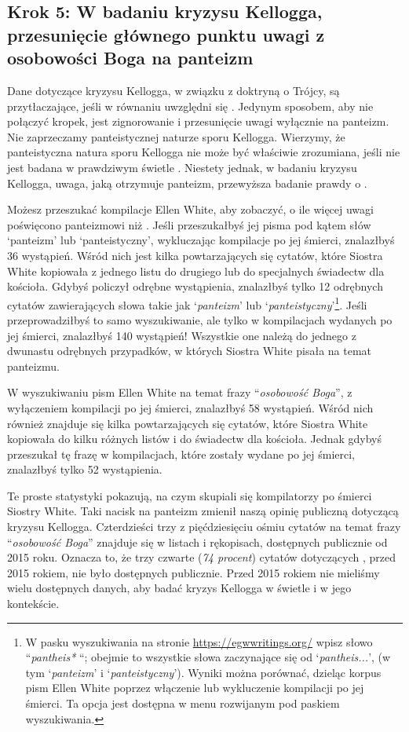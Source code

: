 \subsection*{Krok 5: W badaniu kryzysu Kellogga, przesunięcie głównego punktu uwagi z osobowości Boga na panteizm}

Dane dotyczące kryzysu Kellogga, w związku z doktryną o Trójcy, są przytłaczające, jeśli w równaniu uwzględni się  . Jedynym sposobem, aby nie połączyć kropek, jest zignorowanie  i przesunięcie uwagi wyłącznie na panteizm. Nie zaprzeczamy panteistycznej naturze sporu Kellogga. Wierzymy, że panteistyczna natura sporu Kellogga nie może być właściwie zrozumiana, jeśli nie jest badana w prawdziwym świetle . Niestety jednak, w badaniu kryzysu Kellogga, uwaga, jaką otrzymuje panteizm, przewyższa badanie prawdy o .

Możesz przeszukać kompilacje Ellen White, aby zobaczyć, o ile więcej uwagi poświęcono panteizmowi niż . Jeśli przeszukałbyś jej pisma pod kątem słów ‘panteizm’ lub ‘panteistyczny’, wykluczając kompilacje po jej śmierci, znalazłbyś 36 wystąpień. Wśród nich jest kilka powtarzających się cytatów, które Siostra White kopiowała z jednego listu do drugiego lub do specjalnych świadectw dla kościoła. Gdybyś policzył odrębne wystąpienia, znalazłbyś tylko 12 odrębnych cytatów zawierających słowa takie jak ‘\textit{panteizm}’ lub ‘\textit{panteistyczny}’\footnote{W pasku wyszukiwania na stronie \href{https://egwwritings.org/}{https://egwwritings.org/} wpisz słowo “\textit{pantheis*} “; obejmie to wszystkie słowa zaczynające się od ‘\textit{pantheis...}’, (w tym ‘\textit{panteizm}’ i ‘\textit{panteistyczny}’). Wyniki można porównać, dzieląc korpus pism Ellen White poprzez włączenie lub wykluczenie kompilacji po jej śmierci. Ta opcja jest dostępna w menu rozwijanym pod paskiem wyszukiwania.}. Jeśli przeprowadziłbyś to samo wyszukiwanie, ale tylko w kompilacjach wydanych po jej śmierci, znalazłbyś 140 wystąpień! Wszystkie one należą do jednego z dwunastu odrębnych przypadków, w których Siostra White pisała na temat panteizmu.

W wyszukiwaniu pism Ellen White na temat frazy “\textit{osobowość Boga}”, z wyłączeniem kompilacji po jej śmierci, znalazłbyś 58 wystąpień. Wśród nich również znajduje się kilka powtarzających się cytatów, które Siostra White kopiowała do kilku różnych listów i do świadectw dla kościoła. Jednak gdybyś przeszukał tę frazę w kompilacjach, które zostały wydane po jej śmierci, znalazłbyś tylko 52 wystąpienia.

Te proste statystyki pokazują, na czym skupiali się kompilatorzy po śmierci Siostry White. Taki nacisk na panteizm zmienił naszą opinię publiczną dotyczącą kryzysu Kellogga. Czterdzieści trzy z pięćdziesięciu ośmiu cytatów na temat frazy “\textit{osobowość Boga}” znajduje się w listach i rękopisach, dostępnych publicznie od 2015 roku. Oznacza to, że trzy czwarte (\textit{74 procent}) cytatów dotyczących , przed 2015 rokiem, nie było dostępnych publicznie. Przed 2015 rokiem nie mieliśmy wielu dostępnych danych, aby badać kryzys Kellogga w świetle  i w jego kontekście.


